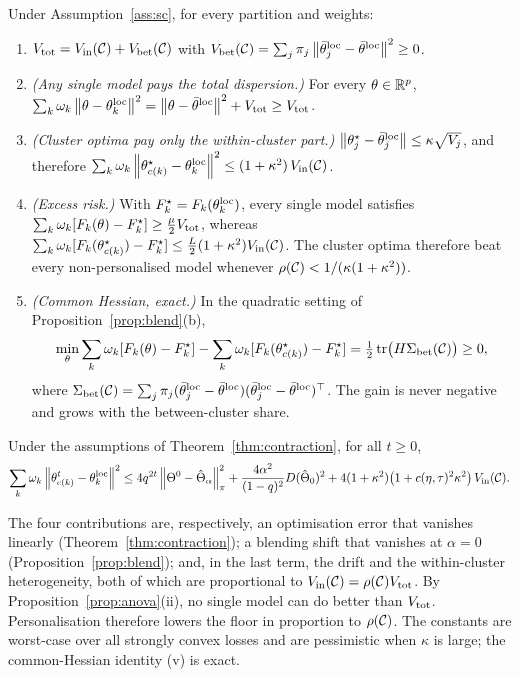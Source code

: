 \begin{proposition}\label{prop:anova}
Under Assumption~\ref{ass:sc}, for every partition and weights:
\begin{enumerate}[label=(\roman*),leftmargin=1.6em,itemsep=1pt]
  \item $V_{\mathrm{tot}}=V_{\mathrm{in}}(\mathcal{C})+V_{\mathrm{bet}}(\mathcal{C})$ with
    $V_{\mathrm{bet}}(\mathcal{C})=\sum_j\pi_j\left\lVert \bar\theta_j^{\mathrm{loc}}-\bar\theta^{\mathrm{loc}} \right\rVert^2\ge0$.
  \item \emph{(Any single model pays the total dispersion.)} For every $\theta\in\mathbb{R}^p$,
    $\sum_k\omega_k\left\lVert \theta-\theta_k^{\mathrm{loc}} \right\rVert^2=\left\lVert \theta-\bar\theta^{\mathrm{loc}} \right\rVert^2+V_{\mathrm{tot}}\ge V_{\mathrm{tot}}$.
  \item \emph{(Cluster optima pay only the within-cluster part.)}
    $\left\lVert \theta_j^\star-\bar\theta^{\mathrm{loc}}_j \right\rVert\le\kappa\sqrt{V_j}$, and therefore
    $\sum_k\omega_k\left\lVert \theta^\star_{c(k)}-\theta_k^{\mathrm{loc}} \right\rVert^2\le(1+\kappa^2)\,V_{\mathrm{in}}(\mathcal{C})$.
  \item \emph{(Excess risk.)} With $F_k^\star=F_k(\theta_k^{\mathrm{loc}})$, every single model
    satisfies $\sum_k\omega_k[F_k(\theta)-F_k^\star]\ge\frac\mu2V_{\mathrm{tot}}$, whereas
    $\sum_k\omega_k[F_k(\theta^\star_{c(k)})-F_k^\star]\le\frac L2(1+\kappa^2)V_{\mathrm{in}}(\mathcal{C})$.
    The cluster optima therefore beat every non-personalised model whenever
    $\rho(\mathcal{C})<1/(\kappa(1+\kappa^2))$.
  \item \emph{(Common Hessian, exact.)} In the quadratic setting of
    Proposition~\ref{prop:blend}(b),
    \[
      \min_\theta\sum_k\omega_k[F_k(\theta)-F_k^\star]-\sum_k\omega_k[F_k(\theta^\star_{c(k)})-F_k^\star]
      =\tfrac12\operatorname{tr}\bigl(H\Sigma_{\mathrm{bet}}(\mathcal{C})\bigr)\ge0,
    \]
    where $\Sigma_{\mathrm{bet}}(\mathcal{C})=\sum_j\pi_j(\bar\theta^{\mathrm{loc}}_j-\bar\theta^{\mathrm{loc}})(\bar\theta^{\mathrm{loc}}_j-\bar\theta^{\mathrm{loc}})^\top$.
    The gain is never negative and grows with the between-cluster share.
\end{enumerate}
\end{proposition}

\begin{corollary}\label{cor:endtoend}
Under the assumptions of Theorem~\ref{thm:contraction}, for all $t\ge0$,
\[
  \sum_k\omega_k\left\lVert \theta^t_{c(k)}-\theta_k^{\mathrm{loc}} \right\rVert^2
  \le
  4q^{2t}\left\lVert \Theta^0-\hat\Theta_\alpha \right\rVert_{\pi}^2
  +\frac{4\alpha^2}{(1-q)^2}D(\hat\Theta_0)^2
  +4(1+\kappa^2)\bigl(1+c(\eta,\tau)^2\kappa^2\bigr)\,V_{\mathrm{in}}(\mathcal{C}).
\]
\end{corollary}
The four contributions are, respectively, an optimisation error that vanishes linearly
(Theorem~\ref{thm:contraction}); a blending shift that vanishes at $\alpha=0$
(Proposition~\ref{prop:blend}); and, in the last term, the drift and the within-cluster
heterogeneity, both of which are proportional to $V_{\mathrm{in}}(\mathcal{C})=\rho(\mathcal{C})V_{\mathrm{tot}}$. By
Proposition~\ref{prop:anova}(ii), no single model can do better than $V_{\mathrm{tot}}$. Personalisation
therefore lowers the floor in proportion to $\rho(\mathcal{C})$. The constants are worst-case over
all strongly convex losses and are pessimistic when $\kappa$ is large; the common-Hessian
identity (v) is exact.

